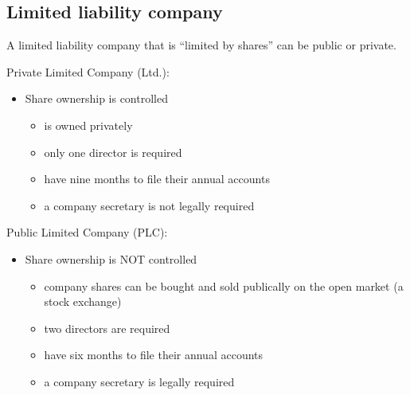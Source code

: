 \subsection{Limited liability company}
A limited liability company that is ``limited by shares'' can be public or private.

Private Limited Company (Ltd.):
\begin{itemize}
    \item Share ownership is controlled
          \begin{itemize}
              \item is owned privately
              \item only one director is required
              \item have nine months to file their annual accounts
              \item a company secretary is not legally required
          \end{itemize}
\end{itemize}

Public Limited Company (PLC):
\begin{itemize}
    \item Share ownership is NOT controlled
          \begin{itemize}
              \item company shares can be bought and sold publically on the open market (a stock exchange)
              \item two directors are required
              \item have six months to file their annual accounts
              \item a company secretary is legally required
          \end{itemize}
\end{itemize}